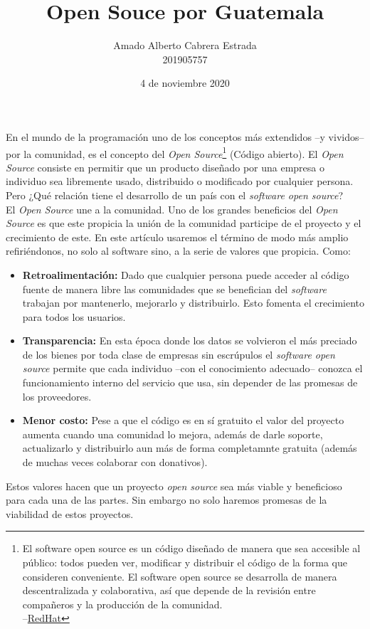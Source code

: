 \documentclass{article}
\title{Open Souce por Guatemala}
\author{Amado Alberto Cabrera Estrada\\
201905757}
\date{4 de noviembre 2020}
\begin{document}
\maketitle

En el mundo de la programación uno de los conceptos más extendidos –y vividos– por la comunidad, es el concepto del \textit{Open Source}\footnote{ El software open source es un código diseñado de manera que sea accesible al público: todos pueden ver, modificar y distribuir el código de la forma que consideren conveniente. El software open source se desarrolla de manera descentralizada y colaborativa, así que depende de la revisión entre compañeros y la producción de la comunidad.\\ –\href{https://www.redhat.com/es/topics/open-source/what-is-open-source}{RedHat}} (Código abierto). El \textit{Open Source} consiste en permitir que un producto diseñado por una empresa o individuo sea libremente usado, distribuido o modificado por cualquier persona. Pero ¿Qué relación tiene el desarrollo de un país con el \textit{software open source}?\\

El \textit{Open Source} une a la comunidad. Uno de los grandes beneficios del \textit{Open Source} es que este propicia la unión de la comunidad participe de el proyecto y el crecimiento de este. En este artículo usaremos el término de modo más amplio refiriéndonos, no solo al software sino, a la serie de valores que propicia. Como:
\begin{itemize}
    \item \textbf{Retroalimentación:}
    Dado que cualquier persona puede acceder al código fuente de manera libre las comunidades que se benefician del \textit{software} trabajan por mantenerlo, mejorarlo y distribuirlo. Esto fomenta el crecimiento para todos los usuarios.
    
    \item \textbf{Transparencia:}
    En esta época donde los datos se volvieron el más preciado de los bienes por toda clase de empresas sin escrúpulos el \textit{software open source} permite que cada individuo –con el conocimiento adecuado– conozca el funcionamiento interno del servicio que usa, sin depender de las promesas de los proveedores.
    
    \item \textbf{Menor costo:}
    Pese a que el código es en sí gratuito el valor del proyecto aumenta cuando una comunidad lo mejora, además de darle soporte, actualizarlo y distribuirlo aun más de forma completamnte gratuita (además de muchas veces colaborar con donativos).
\end{itemize}
Estos valores hacen que un proyecto \textit{open source} sea más viable y beneficioso para cada una de las partes. Sin embargo no solo haremos promesas de la viabilidad de estos proyectos.\\
\end{document}
